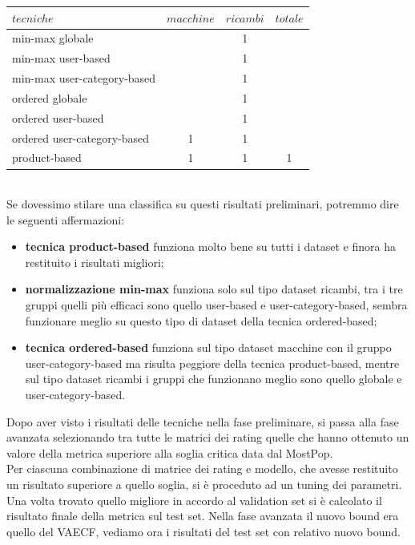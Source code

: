 \begin{tabular}{|l|ccc|}
    \toprule
    $tecniche$  & $macchine$ & $ricambi$ & $totale$   \\
    \midrule
    min-max globale             &   & 1 &   \\
    min-max user-based          &   & 1 &   \\
    min-max user-category-based &   & 1 &   \\
    \bottomrule
    ordered globale             &   & 1 &   \\
    ordered user-based          &   & 1 &   \\
    ordered user-category-based & 1 & 1 &   \\
    \bottomrule
    product-based               & 1 & 1 & 1  \\
    \bottomrule
\end{tabular}\\

Se dovessimo stilare una classifica su questi risultati preliminari, potremmo dire le seguenti affermazioni:
\begin{itemize}
    \item \textbf{tecnica product-based} funziona molto bene su tutti i dataset e finora ha restituito i risultati migliori;
    \item \textbf{normalizzazione min-max} funziona solo sul tipo dataset ricambi, tra i tre gruppi quelli più efficaci sono quello user-based e user-category-based, sembra funzionare meglio su questo tipo di dataset della tecnica ordered-based;
    \item \textbf{tecnica ordered-based} funziona sul tipo dataset macchine con il gruppo user-category-based ma risulta peggiore della tecnica product-based, mentre sul tipo dataset ricambi i gruppi che funzionano meglio sono quello globale e user-category-based.
\end{itemize}

Dopo aver visto i risultati delle tecniche nella fase preliminare, si passa alla fase avanzata selezionando tra tutte le matrici dei rating quelle che hanno ottenuto un valore della metrica superiore alla soglia critica data dal MostPop. \\
Per ciascuna combinazione di matrice dei rating e modello, che avesse restituito un risultato superiore a quello soglia, si è proceduto ad un tuning dei parametri. Una volta trovato quello migliore in accordo al validation set si è calcolato il risultato finale della metrica sul test set.
Nella fase avanzata il nuovo bound era quello del VAECF, vediamo ora i risultati del test set con relativo nuovo bound.\\

